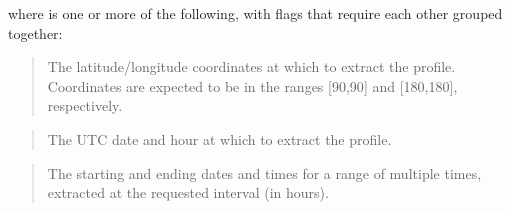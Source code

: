 \documentclass[letterpaper,10pt,english]{sphinxmanual}
\begin{document}
\sphinxAtStartPar
{}

\sphinxAtStartPar
where \sphinxcode{\sphinxupquote{{[}flags{]}}} is one or more of the following, with flags that require each other grouped together:

\sphinxAtStartPar
{}

\sphinxAtStartPar
{}
\begin{quote}

\sphinxAtStartPar
The latitude/longitude coordinates at which to extract the profile.  Coordinates are expected to be in the ranges {[}\sphinxhyphen{}90,90{]} and {[}\sphinxhyphen{}180,180{]}, respectively.
\end{quote}

\sphinxAtStartPar
{}

\sphinxAtStartPar
{}
\begin{quote}

\sphinxAtStartPar
The UTC date and hour  at which to extract the profile.
\end{quote}

\sphinxAtStartPar
{}

\sphinxAtStartPar
{}
\begin{quote}

\sphinxAtStartPar
The starting and ending dates and times for a range of multiple times, extracted at the requested interval (in hours).
\end{quote}
\end{document}
